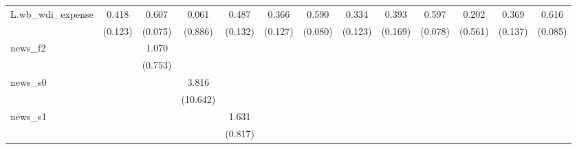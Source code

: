 {\begin{tabular}{l*{12}{c}}
\addlinespace
L.wb\_wdi\_expense&       0.418\sym{***}&       0.607\sym{***}&       0.061         &       0.487\sym{***}&       0.366\sym{***}&       0.590\sym{***}&       0.334\sym{***}&       0.393\sym{**} &       0.597\sym{***}&       0.202         &       0.369\sym{***}&       0.616\sym{***}\\
            &     (0.123)         &     (0.075)         &     (0.886)         &     (0.132)         &     (0.127)         &     (0.080)         &     (0.123)         &     (0.169)         &     (0.078)         &     (0.561)         &     (0.137)         &     (0.085)         \\
\addlinespace
news\_f2     &                     &       1.070         &                     &                     &                     &                     &                     &                     &                     &                     &                     &                     \\
            &                     &     (0.753)         &                     &                     &                     &                     &                     &                     &                     &                     &                     &                     \\
\addlinespace
news\_s0     &                     &                     &       3.816         &                     &                     &                     &                     &                     &                     &                     &                     &                     \\
            &                     &                     &    (10.642)         &                     &                     &                     &                     &                     &                     &                     &                     &                     \\
\addlinespace
news\_s1     &                     &                     &                     &       1.631\sym{**} &                     &                     &                     &                     &                     &                     &                     &                     \\
            &                     &                     &                     &     (0.817)         &                     &                     &                     &                     &                     &                     &                     &                     \\

\end{tabular}}
